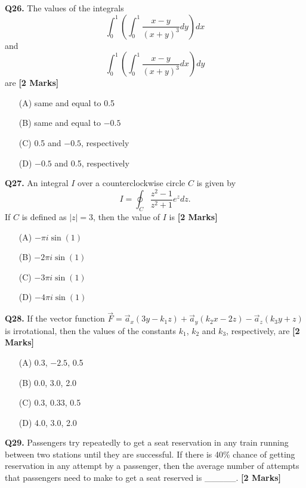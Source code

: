 \documentclass[11pt]{article}
\newcommand{\questionb}[2]{
    \noindent\textbf{Q#2.} #1 \hfill \textbf{[2 Marks]}
}
\begin{document}
\vspace{0.5cm}

\questionb{The values of the integrals 
\[
\int_{0}^{1} \left( \int_{0}^{1} \frac{x - y}{(x + y)^3} dy \right) dx
\]
and
\[
\int_{0}^{1} \left( \int_{0}^{1} \frac{x - y}{(x + y)^3} dx \right) dy
\]
are}{26}
\begin{enumerate}
    \item[(A)] same and equal to 0.5
    \item[(B)] same and equal to $-0.5$
    \item[(C)] 0.5 and $-0.5$, respectively
    \item[(D)] $-0.5$ and 0.5, respectively
\end{enumerate}

\vspace{0.5cm}

\questionb{An integral $I$ over a counterclockwise circle $C$ is given by
\[
I = \oint_C \frac{z^2 - 1}{z^2 + 1} e^z dz.
\]
If $C$ is defined as $|z| = 3$, then the value of $I$ is}{27}
\begin{enumerate}
    \item[(A)] $-\pi i \sin(1)$
    \item[(B)] $-2\pi i \sin(1)$
    \item[(C)] $-3\pi i \sin(1)$
    \item[(D)] $-4\pi i \sin(1)$
\end{enumerate}

\vspace{0.5cm}

\questionb{If the vector function $\vec{F} = \vec{a}_x (3y - k_1 z) + \vec{a}_y (k_2 x - 2z) - \vec{a}_z (k_3 y + z)$ is irrotational, then the values of the constants $k_1$, $k_2$ and $k_3$, respectively, are}{28}
\begin{enumerate}
    \item[(A)] 0.3, $-2.5$, 0.5
    \item[(B)] 0.0, 3.0, 2.0
    \item[(C)] 0.3, 0.33, 0.5
    \item[(D)] 4.0, 3.0, 2.0
\end{enumerate}

\vspace{0.5cm}

\questionb{Passengers try repeatedly to get a seat reservation in any train running between two stations until they are successful. If there is 40\% chance of getting reservation in any attempt by a passenger, then the average number of attempts that passengers need to make to get a seat reserved is \_\_\_\_\_.}{29}
\end{document}

